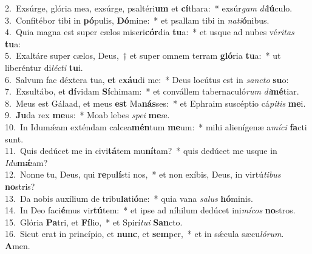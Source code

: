 {2.~}Exsúrge, glória mea, exsúrge, psaltéri\textbf{um} et \textbf{cí}thara:~* exsúr\textit{gam} \textit{di}\textbf{lú}culo.\\
{3.~}Confitébor tibi in \textbf{pó}pulis, \textbf{Dó}mine:~* et psallam tibi in \textit{na}\textit{ti}\textbf{ó}nibus.\\
{4.~}Quia magna est super cælos miseri\textbf{cór}dia \textbf{tu}a:~* et usque ad nubes vé\textit{ri}\textit{tas} \textbf{tu}a:\\
{5.~}Exaltáre super cælos, Deus,~† et super omnem terram \textbf{gló}ria \textbf{tu}a:~* ut liberéntur di\textit{lé}\textit{cti} \textbf{tu}i.\\
{6.~}Salvum fac déxtera tua, \textbf{et} e\textbf{xáu}di me:~* Deus locútus est in \textit{san}\textit{cto} \textbf{su}o:\\
{7.~}Exsultábo, et \textbf{dí}vidam \textbf{Sí}chimam:~* et convállem tabernaculó\textit{rum} \textit{di}\textbf{mé}tiar.\\
{8.~}Meus est Gálaad, et meus \textbf{est} Ma\textbf{nás}ses:~* et Ephraim suscéptio cá\textit{pi}\textit{tis} \textbf{me}i.\\
{9.~}\textbf{Ju}da rex \textbf{me}us:~* Moab lebes \textit{spe}\textit{i} \textbf{me}æ.\\
{10.~}In Idumǽam exténdam calcea\textbf{mén}tum \textbf{me}um:~* mihi alienígenæ a\textit{mí}\textit{ci} \textbf{fa}cti sunt.\\
{11.~}Quis dedúcet me in civi\textbf{tá}tem mu\textbf{ní}tam?~* quis dedúcet me usque in \textit{I}\textit{du}\textbf{mǽ}am?\\
{12.~}Nonne tu, Deus, qui \textbf{re}pu\textbf{lí}sti nos,~* et non exíbis, Deus, in virtú\textit{ti}\textit{bus} \textbf{no}stris?\\
{13.~}Da nobis auxílium de tribu\textbf{la}ti\textbf{ó}ne:~* quia vana \textit{sa}\textit{lus} \textbf{hó}minis.\\
{14.~}In Deo faci\textbf{é}mus vir\textbf{tú}tem:~* et ipse ad níhilum dedúcet ini\textit{mí}\textit{cos} \textbf{no}stros.\\
{15.~}Glória \textbf{Pa}tri, et \textbf{Fí}lio,~* et Spirí\textit{tu}\textit{i} \textbf{San}cto.\\
{16.~}Sicut erat in princípio, et \textbf{nunc}, et \textbf{sem}per,~* et in sǽcula sæcu\textit{ló}\textit{rum}. \textbf{A}men.\\
